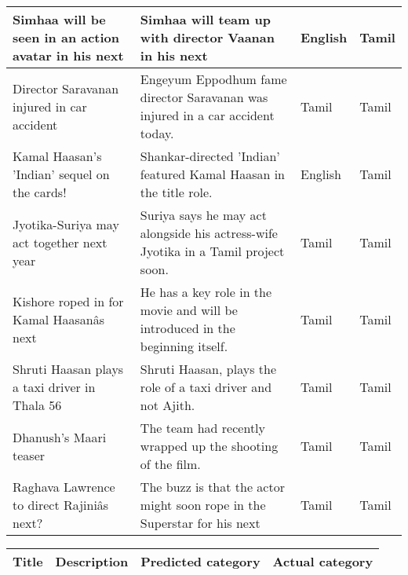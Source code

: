\begin{itemize}
\begin{table}
\begin{center}
\begin{longtable}{|p{3cm}|p{7cm}|p{1.5cm}|p{1.5cm}|}
   Simhaa will be seen in an action avatar in his next&  Simhaa will team up with director Vaanan in his next&  English&  Tamil\\ \hline
   Director Saravanan injured in car accident&  Engeyum Eppodhum fame director Saravanan was injured in a car accident today.&  Tamil&  Tamil\\ \hline
   Kamal Haasan's 'Indian' sequel on the cards!&  Shankar-directed 'Indian' featured Kamal Haasan in the title role.&  English&  Tamil\\ \hline
   Jyotika-Suriya may act together next year&  Suriya says he may act alongside his actress-wife Jyotika in a Tamil project soon.&  Tamil&  Tamil\\ \hline
   Kishore roped in for Kamal Haasanâs next& He has a key role in the movie and will be introduced in the beginning itself.&  Tamil&  Tamil\\ \hline
   Shruti Haasan plays a taxi driver in Thala 56& Shruti Haasan, plays the role of a taxi driver and not Ajith.&  Tamil&  Tamil\\ \hline
   Dhanush's Maari teaser&  The team had recently wrapped up the shooting of the film.&  Tamil&  Tamil\\ \hline
   Raghava Lawrence to direct Rajiniâs next?&  The buzz is that the actor might soon rope in the Superstar for his next&  Tamil&  Tamil\\ \hline\end{longtable}
\end{center}
\end{table}

\begin{table}
\newpage
\label{}
\begin{center}
\begin{longtable}{|p{3cm}|p{7cm}|p{1.5cm}|p{1.5cm}|}
\hline
\textbf{Title} & \textbf{Description} & \textbf{Predicted category} & \textbf{Actual category} \\ \hline


\end{longtable}
\end{center}
\end{table}
\end{itemize}
